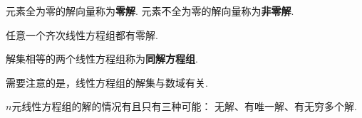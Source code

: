 \begin{definition}
元素全为零的解向量称为\textbf{零解}.
元素不全为零的解向量称为\textbf{非零解}.
\end{definition}

\begin{theorem}
任意一个齐次线性方程组都有零解.
\end{theorem}

\begin{definition}
解集相等的两个线性方程组称为\textbf{同解方程组}.
\end{definition}

需要注意的是，线性方程组的解集与数域有关.

\begin{theorem}
\(n\)元线性方程组的解的情况有且只有三种可能：
无解、有唯一解、有无穷多个解.
\end{theorem}

